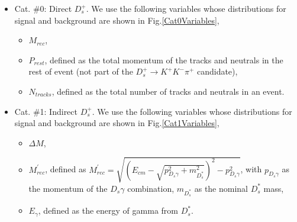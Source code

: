 \begin{itemize}
    \item Cat. \#0: Direct $D_{s}^{+}$. We use the following variables whose distributions for signal and background are shown in Fig.\ref{Cat0Variables},
        \begin{itemize}
            \item[1. ] $M_{rec}$,
            \item[2. ] $P_{rest}$, defined as the total momentum of the tracks and neutrals in the rest of event (not part of the $D_{s}^{+} \rightarrow K^{+}K^{-}\pi^{+}$ candidate),
            \item[3. ] $N_{tracks}$, defined as the total number of tracks and neutrals in an event.
        \end{itemize}
    \item Cat. \#1: Indirect $D_{s}^{+}$.
        We use the following variables whose distributions for signal and background are shown in Fig.\ref{Cat1Variables},
        \begin{itemize}
            \item[1. ] $\Delta{M}$,
            \item[2. ] $M_{rec}^{'}$, defined as $M_{rec}^{'} = \sqrt{ {(E_{cm}  - \sqrt{p_{D_{s}\gamma}^{2} + m_{D_{s}^{*}}^{2}}) }^{2} - p_{D_{s}\gamma}^{2}}$, with $p_{D_{s}\gamma}$ as the momentum of the $D_{s}\gamma$ combination, $m_{D_{s}^{*}}$ as the nominal ${D_{s}^{*}}$ mass,
            \item[3. ] $E_{\gamma}$, defined as the energy of gamma from $D_{s}^{*}$.
        \end{itemize}
\end{itemize}



